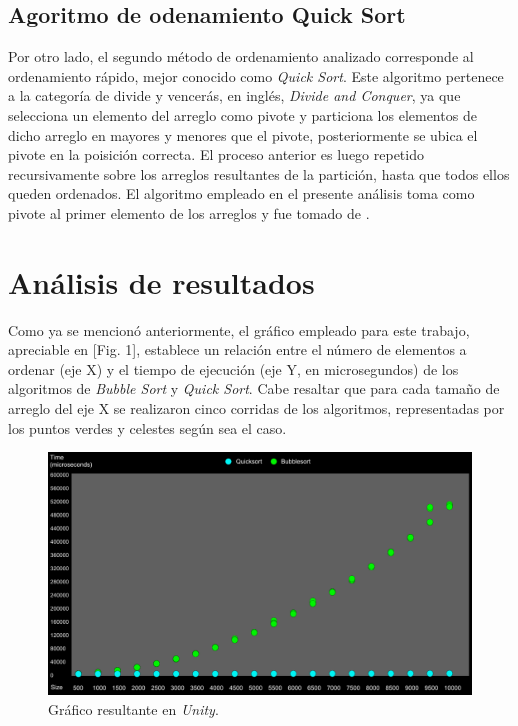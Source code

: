 \documentclass[conference]{IEEEtran}
\begin{document}
\subsection{Agoritmo de odenamiento Quick Sort}

Por otro lado, el segundo método de ordenamiento analizado corresponde al ordenamiento rápido, mejor conocido
como \textit{Quick Sort}. Este algoritmo pertenece a la categoría de divide y vencerás, en inglés, \textit{Divide and Conquer},
ya que selecciona un elemento del arreglo como pivote y particiona los elementos de dicho arreglo en mayores y menores que el 
pivote, posteriormente se ubica el pivote en la poisición correcta\cite{b1}. El proceso anterior es luego repetido recursivamente sobre
los arreglos resultantes de la partición, hasta que todos ellos queden ordenados. El algoritmo empleado en el presente 
análisis toma como pivote al primer elemento de los arreglos y fue tomado de \cite{b1}.\\

\section{Análisis de resultados}
Como ya se mencionó anteriormente, el gráfico empleado para este trabajo, apreciable en [Fig. 1], establece un relación entre
 el número de elementos a ordenar (eje X) y el tiempo de ejecución (eje Y, en microsegundos) de los algoritmos de
 \textit{Bubble Sort} y \textit{Quick Sort}. Cabe resaltar que para cada tamaño de arreglo del eje X se realizaron cinco corridas de
los algoritmos, representadas por los puntos verdes y celestes según sea el caso.

\begin{figure}[htbp]
\centerline{\includegraphics[scale=0.34]{grafico.png}}
\caption{Gráfico resultante en \textit{Unity}.}
\label{fig}
\end{figure}
\end{document}
